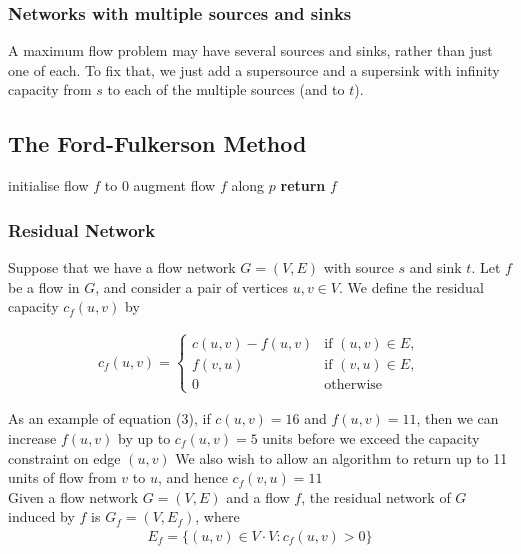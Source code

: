 \subsubsection{Networks with multiple sources and sinks}
A maximum flow problem may have several sources and sinks, rather than just one of each. To fix that, we just add a supersource and a supersink with infinity capacity from $s$ to each of the multiple sources (and to $t$).
\subsection{The Ford-Fulkerson Method}

\begin{algorithm}
\begin{algorithmic}[1]
   \State initialise flow $f$ to $0$
      \State augment flow $f$ along $p$
   \EndWhile
   \State \textbf{return} $f$
\end{algorithmic}
\end{algorithm}
\subsubsection{Residual Network}
Suppose that we have a flow network $G = (V, E)$ with source $s$ and sink $t$. Let $f$ be a flow in $G$, and consider a pair of vertices $u, v \in V$. We define the residual capacity $c_f(u, v)$ by

\begin{align}
 c_f(u,v) =
  \begin{cases}
  	c(u,v) - f(u,v) & \text{if } (u,v) \in E, \\
  	f(v,u) & \text{if } (v,u) \in E, \\
  	0 & \text{otherwise}
  \end{cases}
\end{align}

As an example of equation (3), if $c(u, v) = 16$ and $f(u, v) = 11$, then we can increase $f(u, v)$ by up to $c_f(u, v) = 5$ units before we exceed the capacity constraint on edge $(u, v)$ We also wish to allow an algorithm to return up to 11 units of flow from $v$ to $u$, and hence $c_f(v, u) = 11$\\

Given a flow network $G = (V, E)$ and a flow $f$, the residual network of $G$ induced by $f$ is $G_f = (V, E_f)$, where
\begin{align}
	E_f = \{(u, v) \in V \cdot V : c_f(u, v) > 0\}
\end{align} 

